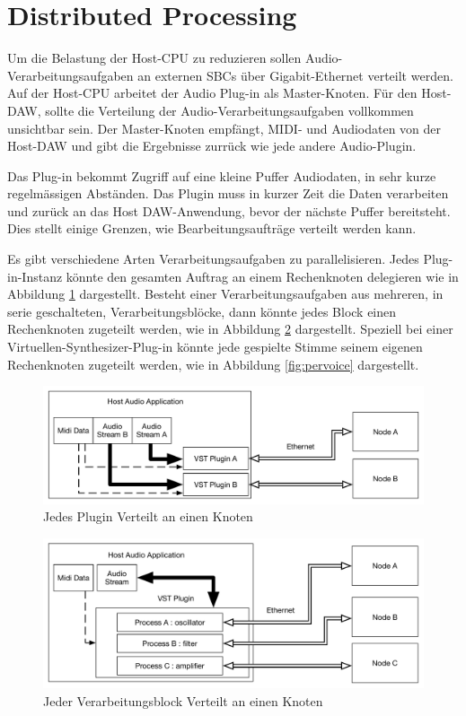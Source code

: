 \section{Distributed Processing}

Um die Belastung der Host-CPU zu reduzieren sollen Audio-Verarbeitungsaufgaben an externen SBCs über Gigabit-Ethernet verteilt werden. Auf der Host-CPU arbeitet der  Audio Plug-in als Master-Knoten. Für den Host-DAW, sollte die Verteilung der Audio-Verarbeitungsaufgaben vollkommen unsichtbar sein. Der Master-Knoten empfängt, MIDI- und Audiodaten von der Host-DAW und gibt die Ergebnisse zurrück wie jede andere Audio-Plugin.

Das Plug-in bekommt Zugriff auf eine kleine Puffer Audiodaten, in sehr kurze regelmässigen Abständen. Das Plugin muss in kurzer Zeit die Daten verarbeiten und zurück an das Host DAW-Anwendung, bevor der nächste Puffer bereitsteht. Dies stellt einige Grenzen, wie Bearbeitungsaufträge verteilt werden kann.

Es gibt verschiedene Arten Verarbeitungsaufgaben zu parallelisieren. Jedes Plug-in-Instanz könnte den gesamten Auftrag an einem Rechenknoten delegieren wie in Abbildung \ref{fig:one_to_one} dargestellt. Besteht einer Verarbeitungsaufgaben aus mehreren, in serie geschalteten, Verarbeitungsblöcke, dann könnte jedes Block einen Rechenknoten zugeteilt werden, wie in Abbildung \ref{fig:perproccessor} dargestellt. Speziell bei einer Virtuellen-Synthesizer-Plug-in könnte jede gespielte Stimme seinem eigenen Rechenknoten zugeteilt werden, wie in Abbildung \ref{fig:pervoice} dargestellt.


\begin{figure}[H]
    \centering
    \includegraphics[width=\textwidth]{assets/distribution_1to1.pdf}
    \caption{Jedes Plugin Verteilt an einen Knoten}
    \label{fig:one_to_one}
\end{figure}

\begin{figure}[H]
    \centering
    \includegraphics[width=\textwidth]{assets/distribution_perprocessor.pdf}
    \caption{Jeder Verarbeitungsblock Verteilt an einen Knoten}
    \label{fig:perproccessor}
\end{figure}

